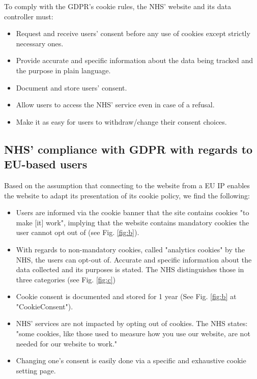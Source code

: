 \documentclass[twocolumn, letterpaper,13pt]{scrartcl}
\begin{document}
	To comply with the GDPR's cookie rules, the NHS' website and its data controller must\cite{cookieGDPR}:
    \begin{itemize}
        \item Request and receive users’ consent before any use of cookies except strictly necessary ones.
        \item Provide accurate and specific information about the data being tracked and the purpose in plain language.
        \item Document and store users' consent.
        \item Allow users to access the NHS' service even in case of a refusal.
        \item Make it as easy for users to withdraw/change their consent choices.
    \end{itemize}
	
	\subsection*{NHS' compliance with GDPR with regards to EU-based users}
	
	Based on the assumption that connecting to the website from a EU IP enables the website to adapt its presentation of its cookie policy, we find the following:
	
	\begin{itemize}
	    \item Users are informed via the cookie banner that the site contains cookies "to make [it] work", implying that the website contains mandatory cookies the user cannot opt out of (see Fig. \ref{fig:b}).
	    \item With regards to non-mandatory cookies, called "analytics cookies" by the NHS, the users can opt-out of. Accurate and specific information about the data collected and its purposes is stated. The NHS distinguishes those in three categories (see Fig. \ref{fig:c})
	    \item Cookie consent is documented and stored for 1 year (See Fig. \ref{fig:b} at "CookieConsent"). 
	    \item NHS' services are not impacted by opting out of cookies\cite{cookiepolicy}. The NHS states: "some cookies, like those used to measure how you use our website, are not needed for our website to work."
	    \item Changing one's consent is easily done via a specific and exhaustive cookie setting page\cite{cookiesettings}.
	\end{itemize}
	
\end{document}
